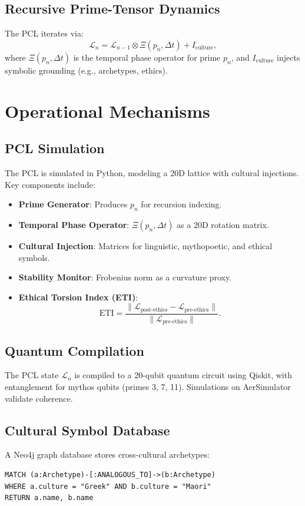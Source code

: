 \documentclass[11pt]{article}
\theoremstyle{plain}
\theoremstyle{definition}
\begin{document}
\subsection{Recursive Prime-Tensor Dynamics}
The PCL iterates via:
\begin{equation}
\mathcal{L}_n = \mathcal{L}_{n-1} \otimes \Xi(p_n, \Delta t) + I_{\text{culture}},
\end{equation}
where \( \Xi(p_n, \Delta t) \) is the temporal phase operator for prime \( p_n \), and \( I_{\text{culture}} \) injects symbolic grounding (e.g., archetypes, ethics).

\section{Operational Mechanisms}
\subsection{PCL Simulation}
The PCL is simulated in Python, modeling a 20D lattice with cultural injections. Key components include:
\begin{itemize}
    \item \textbf{Prime Generator}: Produces \( p_n \) for recursion indexing.
    \item \textbf{Temporal Phase Operator}: \( \Xi(p_n, \Delta t) \) as a 20D rotation matrix.
    \item \textbf{Cultural Injection}: Matrices for linguistic, mythopoetic, and ethical symbols.
    \item \textbf{Stability Monitor}: Frobenius norm as a curvature proxy.
    \item \textbf{Ethical Torsion Index (ETI)}:
    \[
    \text{ETI} = \frac{\|\mathcal{L}_{\text{post-ethics}} - \mathcal{L}_{\text{pre-ethics}}\|}{\|\mathcal{L}_{\text{pre-ethics}}\|}.
    \]
\end{itemize}

\subsection{Quantum Compilation}
The PCL state \( \mathcal{L}_n \) is compiled to a 20-qubit quantum circuit using Qiskit, with entanglement for mythos qubits (primes 3, 7, 11). Simulations on AerSimulator validate coherence.

\subsection{Cultural Symbol Database}
A Neo4j graph database stores cross-cultural archetypes:
\begin{verbatim}
MATCH (a:Archetype)-[:ANALOGOUS_TO]->(b:Archetype)
WHERE a.culture = "Greek" AND b.culture = "Maori"
RETURN a.name, b.name
\end{verbatim}
\end{document}
